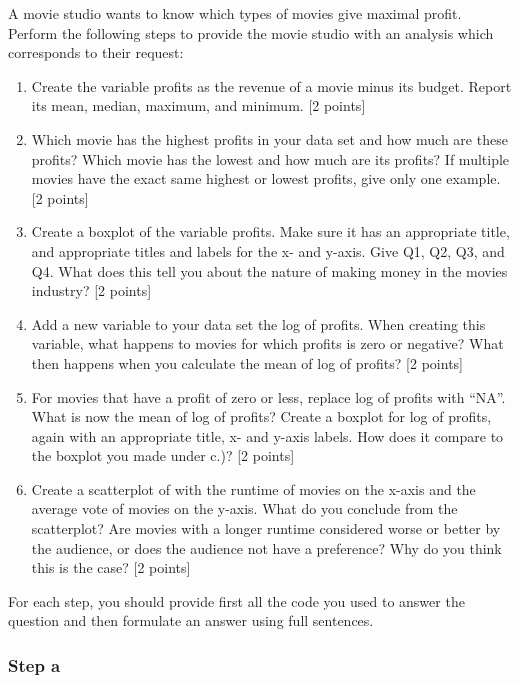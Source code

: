 \documentclass[
]{article}
\begin{document}
A movie studio wants to know which types of movies give maximal profit.
Perform the following steps to provide the movie studio with an analysis
which corresponds to their request:

\begin{enumerate}
\def\labelenumi{\alph{enumi}.}
\item
  Create the variable profits as the revenue of a movie minus its
  budget. Report its mean, median, maximum, and minimum. {[}2 points{]}
\item
  Which movie has the highest profits in your data set and how much are
  these profits? Which movie has the lowest and how much are its
  profits? If multiple movies have the exact same highest or lowest
  profits, give only one example. {[}2 points{]}
\item
  Create a boxplot of the variable profits. Make sure it has an
  appropriate title, and appropriate titles and labels for the x- and
  y-axis. Give Q1, Q2, Q3, and Q4. What does this tell you about the
  nature of making money in the movies industry? {[}2 points{]}
\item
  Add a new variable to your data set the log of profits. When creating
  this variable, what happens to movies for which profits is zero or
  negative? What then happens when you calculate the mean of log of
  profits? {[}2 points{]}
\item
  For movies that have a profit of zero or less, replace log of profits
  with ``NA''. What is now the mean of log of profits? Create a boxplot
  for log of profits, again with an appropriate title, x- and y-axis
  labels. How does it compare to the boxplot you made under c.)? {[}2
  points{]}
\item
  Create a scatterplot of with the runtime of movies on the x-axis and
  the average vote of movies on the y-axis. What do you conclude from
  the scatterplot? Are movies with a longer runtime considered worse or
  better by the audience, or does the audience not have a preference?
  Why do you think this is the case? {[}2 points{]}
\end{enumerate}

For each step, you should provide first all the code you used to answer
the question and then formulate an answer using full sentences.

\subsubsection{Step a}\label{step-a}
\end{document}
